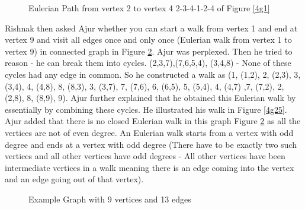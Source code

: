 \begin{figure}
\begin{center}
\caption{ Eulerian Path from vertex 2 to vertex 4 2-3-4-1-2-4 of Figure \ref{4g1}}\label{4g15}
\end{center}
\end{figure}
\vspace{2cm}
Rishnak then asked Ajur whether you can start a walk from vertex 1 and end at vertex 9 and visit all edges once and only once (Eulerian walk from vertex 1 to vertex 9) in connected graph in Figure \ref{4g2}.
Ajur was perplexed. Then he tried to reason - he can break them into cycles. (2,3,7),(7,6,5,4), (3,4,8)  - None of these cycles had any edge in common. So he constructed a walk as (1, (1,2), 2, (2,3),
3, (3,4), 4, (4,8), 8, (8,3), 3, (3,7), 7, (7,6), 6, (6,5), 5, (5,4), 4, (4,7) ,7,
(7,2), 2, (2,8), 8, (8,9), 9). Ajur further explained that he obtained this Eulerian walk by essentially by combining these cycles. He illustrated his walk in Figure \ref{4g25}. Ajur added that there is no closed Eulerian walk in this graph Figure \ref{4g2} as all the vertices are not of even degree. An Eulerian walk starts from a vertex with odd degree and ends at a vertex with odd degree (There have to be exactly two such vertices and all other vertices have odd degrees - All other vertices have been intermediate vertices in a walk meaning there is an edge coming into the vertex and an edge going out of that vertex).

\begin{figure}
\begin{center}
\caption{ Example Graph with 9 vertices and 13 edges}\label{4g2}
\end{center}
\end{figure}

